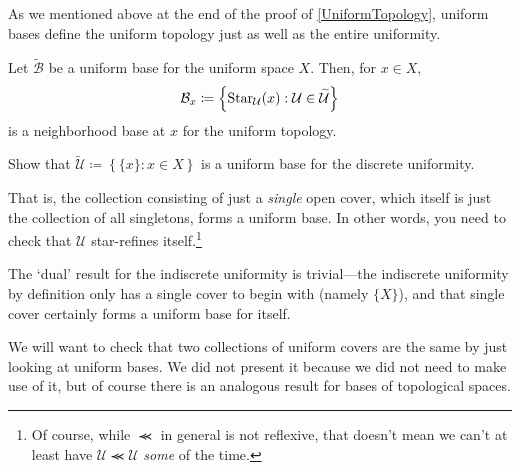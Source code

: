 As we mentioned above at the end of the proof of \cref{UniformTopology}, uniform bases define the uniform topology just as well as the entire uniformity.
\begin{crl}
Let $\widetilde{\mathcal{B}}$ be a uniform base for the uniform space $X$.  Then, for $x\in X$,
\begin{equation}
\mathcal{B}_x\coloneqq \left\{ \operatorname{Star} _{\mathcal{U}}(x):\mathcal{U}\in \widetilde{\mathcal{U}}\right\}
\end{equation}
is a neighborhood base at $x$ for the uniform topology.
\end{crl}
\begin{exr}
Show that $\widetilde{\mathcal{U}}\coloneqq \left\{ \{ x\} :x\in X\right\}$ is a uniform base for the discrete uniformity.
\begin{rmk}
That is, the collection consisting of just a \emph{single} open cover, which itself is just the collection of all singletons, forms a uniform base.  In other words, you need to check that $\mathcal{U}$ star-refines itself.\footnote{Of course, while $\llcurly$ in general is not reflexive, that doesn't mean we can't at least have $\mathcal{U}\llcurly \mathcal{U}$ \emph{some} of the time.}
\end{rmk}
\begin{rmk}
The `dual' result for the indiscrete uniformity is trivial---the indiscrete uniformity by definition only has a single cover to begin with (namely $\{ X\}$), and that single cover certainly forms a uniform base for itself.
\end{rmk}
\end{exr}
We will want to check that two collections of uniform covers are the same by just looking at uniform bases.  We did not present it because we did not need to make use of it, but of course there is an analogous result for bases of topological spaces.
